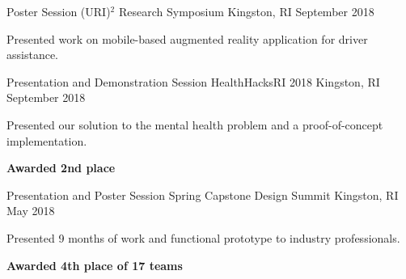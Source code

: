 \graduateheader
\begin{cventries}
    \cventry
    {Poster Session}
    {(URI)$^2$ Research Symposium}
    {Kingston, RI}
    {September 2018}
    {
      \begin{cvitems}
        \item{Presented work on mobile-based augmented reality application for driver assistance.}
      \end{cvitems}
    }
  \cventry
    {Presentation and Demonstration Session}
    {HealthHacksRI 2018}
    {Kingston, RI}
    {September 2018}
    {
      \begin{cvitems}
        \item{Presented our solution to the mental health problem and a proof-of-concept implementation.}
        \item{\textbf{Awarded 2nd place}}
      \end{cvitems}
    }
\end{cventries}
\vspace{-10 pt}
\ugradheader
\begin{cventries}
  \cventry
    {Presentation and Poster Session}
    {Spring Capstone Design Summit}
    {Kingston, RI}
    {May 2018}
    {
    \begin{cvitems}
      \item{Presented 9 months of work and functional prototype to industry professionals.}
      \item{\textbf{Awarded 4th place of 17 teams}}
    \end{cvitems}
    }
\end{cventries}
\vspace{-10 pt}